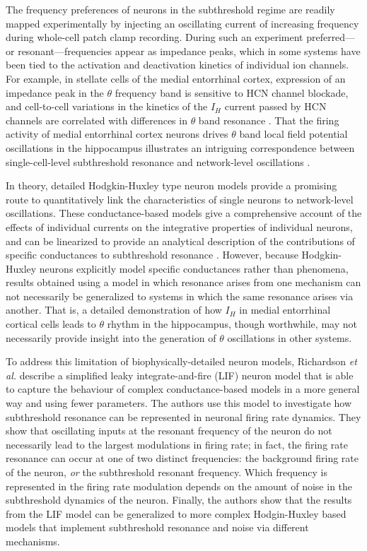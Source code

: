 \documentclass[12pt]{article}
\begin{document}
The frequency preferences of neurons in the subthreshold regime are readily mapped experimentally by injecting an oscillating current of increasing frequency during whole-cell patch clamp recording.
During such an experiment preferred---or resonant---frequencies appear as impedance peaks, which in some systems have been tied to the activation and deactivation kinetics of individual ion channels.
For example, in stellate cells of the medial entorrhinal cortex, expression of an impedance peak in the $\theta$ frequency band is sensitive to HCN channel blockade, and cell-to-cell variations in the kinetics of the $I_H$ current passed by HCN channels are correlated with differences in $\theta$ band resonance \cite{giocomo_time_2008}.
That the firing activity of medial entorrhinal cortex neurons drives $\theta$ band local field potential oscillations in the hippocampus illustrates an intriguing correspondence between single-cell-level subthreshold resonance and network-level oscillations \cite{colgin_mechanisms_2013}.

In theory, detailed Hodgkin-Huxley type neuron models provide a promising route to quantitatively link the characteristics of single neurons to network-level oscillations.
These conductance-based models give a comprehensive account of the effects of individual currents on the integrative properties of individual neurons, and can be linearized to provide an analytical description of the contributions of specific conductances to subthreshold resonance \cite{hodgkin_quantitative_1952}.
However, because Hodgkin-Huxley neurons explicitly model specific conductances rather than phenomena, results obtained using a model in which resonance arises from one mechanism can not necessarily be generalized to systems in which the same resonance arises via another.
That is, a detailed demonstration of how $I_H$ in medial entorrhinal cortical cells leads to $\theta$ rhythm in the hippocampus, though worthwhile, may not necessarily provide insight into the generation of $\theta$ oscillations in other systems.

To address this limitation of biophysically-detailed neuron models, Richardson \textit{et al.} describe a simplified leaky integrate-and-fire (LIF) neuron model that is able to capture the behaviour of complex conductance-based models in a more general way and using fewer parameters.
The authors use this model to investigate how subthreshold resonance can be represented in neuronal firing rate dynamics.
They show that oscillating inputs at the resonant frequency of the neuron do not necessarily lead to the largest modulations in firing rate; in fact, the firing rate resonance can occur at one of two distinct frequencies: the background firing rate of the neuron, \textit{or} the subthreshold resonant frequency.
Which frequency is represented in the firing rate modulation depends on the amount of noise in the subthreshold dynamics of the neuron.
Finally, the authors show that the results from the LIF model can be generalized to more complex Hodgin-Huxley based models that implement subthreshold resonance and noise via different mechanisms.
\end{document}
